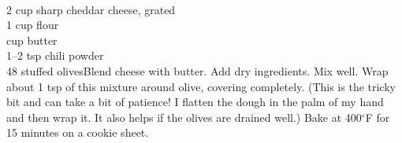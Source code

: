 \begin{minipage}{\linewidth}
\end{minipage}\par\begin{minipage}{\linewidth} 
 \\
\step
	{2 cup sharp cheddar cheese, grated \\
 1 cup flour \\
  cup butter \\
 1--2 tsp chili powder \\
 48 stuffed olives}{Blend cheese with butter. Add dry ingredients. Mix well. Wrap about 1 tsp of this mixture around olive, covering completely. (This is the tricky bit and can take a bit of patience! I flatten the dough in the palm of my hand and then wrap it. It also helps if the olives are drained well.) Bake at 400$^\circ$F for 15 minutes on a cookie sheet.}


		

\end{minipage}
